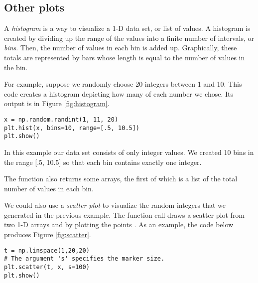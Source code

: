 \begin{comment}
\begin{figure} \texttt{[image: interact.pdf]}
\caption{A snapshot of an interactive plot made using Matplotlib.}
\label{mpl:interact} \end{figure}

\begin{problem} Modify the code above to add a third slider to
manipulate the phase of the wave shown. Have it range from 0 to $2\pi$
and set the default value to zero. \end{problem}

\end{comment}

\subsection*{Other plots}
A \emph{histogram} is a way to visualize a 1-D data set, or list of values. 
A histogram is created by dividing up the range of the values into a finite number of intervals, or \emph{bins}.
Then, the number of values in each bin is added up.
Graphically, these totals are represented by bars whose length is equal to the number of values in the bin.

For example, suppose we randomly choose 20 integers between 1 and 10.
This code creates a histogram depicting how many of each number we chose.
Its output is in Figure \ref{fig:histogram}.

\begin{lstlisting}
x = np.random.randint(1, 11, 20)
plt.hist(x, bins=10, range=[.5, 10.5])
plt.show()
\end{lstlisting}

In this example our data set  consists of only integer values.
We created 10 bins in the range [.5, 10.5] so that each bin contains exactly one integer.

The function  also returns some arrays, the first of which is a list of the total number of values in each bin.

We could also use a \emph{scatter plot} to visualize the random integers  that we generated in the previous example. 
The  function call  draws a scatter plot from two 1-D arrays  and  by plotting the points .
As an example, the code below produces Figure \ref{fig:scatter}.

\begin{lstlisting}
t = np.linspace(1,20,20)
# The argument 's' specifies the marker size.
plt.scatter(t, x, s=100)
plt.show()
\end{lstlisting}



